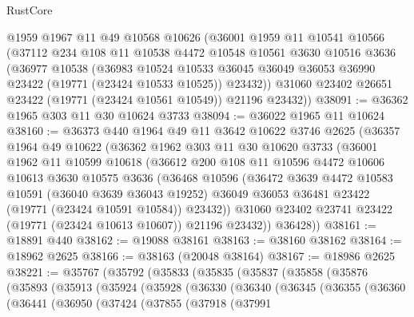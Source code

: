 \begin{lexlean}{RustCore}
\begin{coremodule}
    @1959
    @1967
    @11
    @49
    @10568
    @10626
    (@36001
      @1959
      @11
      @10541
      @10566
      (@37112
        @234
        @108
        @11
        @10538
        @4472
        @10548
        @10561
        @3630
        @10516
        @3636
        (@36977
          @10538
          (@36983
            @10524
            @10533
            @36045
            @36049
            @36053
            @36990
            @23422
            (@19771 (@23424 @10533 @10525))
            @23432))
        @31060
        @23402
        @26651
        @23422
        (@19771 (@23424 @10561 @10549))
        @21196
        @23432))
@38091 := @36362 @1965 @303 @11 @30 @10624 @3733
@38094 := @36022 @1965 @11 @10624
@38160 := @36373
    @440
    @1964
    @49
    @11
    @3642
    @10622
    @3746
    @2625
    (@36357
      @1964
      @49
      @10622
      (@36362
        @1962
        @303
        @11
        @30
        @10620
        @3733
        (@36001
          @1962
          @11
          @10599
          @10618
          (@36612
            @200
            @108
            @11
            @10596
            @4472
            @10606
            @10613
            @3630
            @10575
            @3636
            (@36468
              @10596
              (@36472
                @3639
                @4472
                @10583
                @10591
                (@36040 @3639 @36043 @19252)
                @36049
                @36053
                @36481
                @23422
                (@19771 (@23424 @10591 @10584))
                @23432))
            @31060
            @23402
            @23741
            @23422
            (@19771 (@23424 @10613 @10607))
            @21196
            @23432))
        @36428))
@38161 := @18891 @440
@38162 := @19088 @38161
@38163 := @38160 @38162
@38164 := @18962 @2625
@38166 := @38163 (@20048 @38164)
@38167 := @18986 @2625
@38221 := @35767
    (@35792
      (@35833
        (@35835
          (@35837
            (@35858
              (@35876
                (@35893
                  (@35913
                    (@35924
                      (@35928
                        (@36330
                          (@36340
                            (@36345
                              (@36355
                                (@36360
                                  (@36441
                                    (@36950
                                      (@37424
                                        (@37855
                                          (@37918
                                            (@37991

\end{coremodule}
\end{lexlean}
